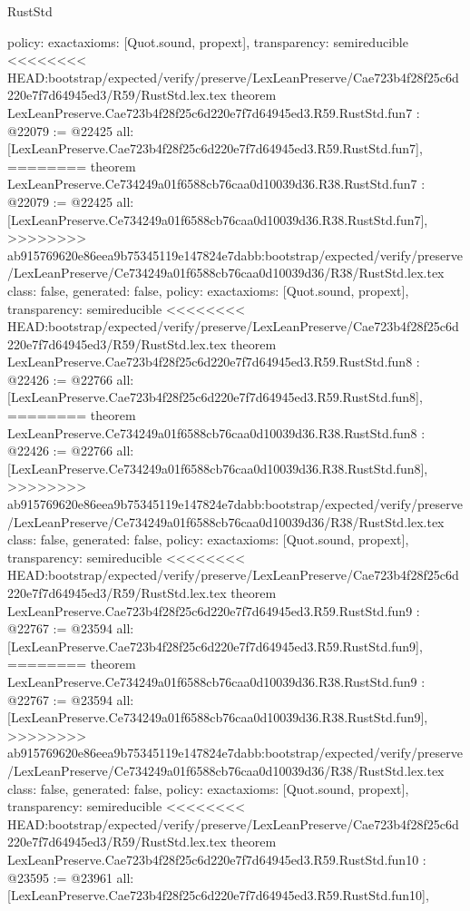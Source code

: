 \begin{lexlean}{RustStd}
\begin{coremodule}
{\begin{coremodule}
{{{{{{{{{{  policy: exact{axioms: [Quot.sound, propext]},
  transparency: semireducible
}
<<<<<<<< HEAD:bootstrap/expected/verify/preserve/LexLeanPreserve/Cae723b4f28f25c6d220e7f7d64945ed3/R59/RustStd.lex.tex
theorem LexLeanPreserve.Cae723b4f28f25c6d220e7f7d64945ed3.R59.RustStd.fun7 : @22079 := @22425 {
  all: [LexLeanPreserve.Cae723b4f28f25c6d220e7f7d64945ed3.R59.RustStd.fun7],
========
theorem LexLeanPreserve.Ce734249a01f6588cb76caa0d10039d36.R38.RustStd.fun7 : @22079 := @22425 {
  all: [LexLeanPreserve.Ce734249a01f6588cb76caa0d10039d36.R38.RustStd.fun7],
>>>>>>>> ab915769620e86eea9b75345119e147824e7dabb:bootstrap/expected/verify/preserve/LexLeanPreserve/Ce734249a01f6588cb76caa0d10039d36/R38/RustStd.lex.tex
  class: false,
  generated: false,
  policy: exact{axioms: [Quot.sound, propext]},
  transparency: semireducible
}
<<<<<<<< HEAD:bootstrap/expected/verify/preserve/LexLeanPreserve/Cae723b4f28f25c6d220e7f7d64945ed3/R59/RustStd.lex.tex
theorem LexLeanPreserve.Cae723b4f28f25c6d220e7f7d64945ed3.R59.RustStd.fun8 : @22426 := @22766 {
  all: [LexLeanPreserve.Cae723b4f28f25c6d220e7f7d64945ed3.R59.RustStd.fun8],
========
theorem LexLeanPreserve.Ce734249a01f6588cb76caa0d10039d36.R38.RustStd.fun8 : @22426 := @22766 {
  all: [LexLeanPreserve.Ce734249a01f6588cb76caa0d10039d36.R38.RustStd.fun8],
>>>>>>>> ab915769620e86eea9b75345119e147824e7dabb:bootstrap/expected/verify/preserve/LexLeanPreserve/Ce734249a01f6588cb76caa0d10039d36/R38/RustStd.lex.tex
  class: false,
  generated: false,
  policy: exact{axioms: [Quot.sound, propext]},
  transparency: semireducible
}
<<<<<<<< HEAD:bootstrap/expected/verify/preserve/LexLeanPreserve/Cae723b4f28f25c6d220e7f7d64945ed3/R59/RustStd.lex.tex
theorem LexLeanPreserve.Cae723b4f28f25c6d220e7f7d64945ed3.R59.RustStd.fun9 : @22767 := @23594 {
  all: [LexLeanPreserve.Cae723b4f28f25c6d220e7f7d64945ed3.R59.RustStd.fun9],
========
theorem LexLeanPreserve.Ce734249a01f6588cb76caa0d10039d36.R38.RustStd.fun9 : @22767 := @23594 {
  all: [LexLeanPreserve.Ce734249a01f6588cb76caa0d10039d36.R38.RustStd.fun9],
>>>>>>>> ab915769620e86eea9b75345119e147824e7dabb:bootstrap/expected/verify/preserve/LexLeanPreserve/Ce734249a01f6588cb76caa0d10039d36/R38/RustStd.lex.tex
  class: false,
  generated: false,
  policy: exact{axioms: [Quot.sound, propext]},
  transparency: semireducible
}
<<<<<<<< HEAD:bootstrap/expected/verify/preserve/LexLeanPreserve/Cae723b4f28f25c6d220e7f7d64945ed3/R59/RustStd.lex.tex
theorem LexLeanPreserve.Cae723b4f28f25c6d220e7f7d64945ed3.R59.RustStd.fun10 : @23595 := @23961 {
  all: [LexLeanPreserve.Cae723b4f28f25c6d220e7f7d64945ed3.R59.RustStd.fun10],
}}}}}}}}}}}}}
\end{coremodule}}
\end{coremodule}
\end{lexlean}
